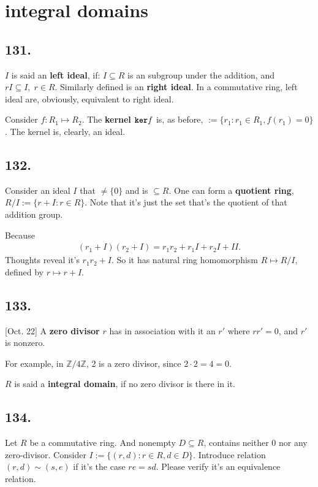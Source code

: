 \documentclass[12pt]{article}
\newcommand\M\cdot%
\newcommand\Mp\mapsto%
\newcommand{\BF}[1]{ \mathbb{#1} }%
\newcommand{\Ss}[1]{\textsf{\bfseries{#1}}}%
\newcommand{\Tw}[1]{\texttt{\bfseries{#1}}}%
\newcommand{\EqGo}[1]{ \begin{gather*}{#1}\end{gather*} } %
\begin{document}
\section{integral domains}
\subsection*{131.} \(I\) is said an \Ss{left ideal}, if: \(I \subseteq R\) is an subgroup under the addition, and \(rI \subseteq I,\; r\in R\). 
Similarly defined is an \Ss{right ideal}. 
In a commutative ring, left ideal are, obviously, equivalent to right ideal. \par
Consider \(f: R_1 \Mp R_2\). 
The \Ss{kernel} \(\Tw{ker} f\) is, as before, \(:= \{r_1: r_1 \in R_1, f(r_1) =0\}\). 
The kernel is, clearly, an ideal.

\subsection*{132.} Consider an ideal \(I\) that \(\neq \{0\}\) and is \(\subseteq R\). 
One can form a \Ss{quotient ring}, \(R/I := \{r+I: r\in R\}\). 
Note that it's just the set that's the quotient of that addition group. \par
Because \EqGo{
 (r_1 + I)(r_2 + I) = r_1 r_2 + r_1 I + r_2 I + II.
} Thoughts reveal it's \(r_1 r_2 +I\). 
So it has natural ring homomorphism \(R \Mp R/I\), defined by \(r \Mp r+I\). 

\subsection*{133.} [Oct. 22] A \Ss{zero divisor} \(r\) has in association with it an \(r'\) where \(rr'=0\), and \(r'\) is nonzero. \par
For example, in \(\BF Z /4 \BF Z\), 2 is a zero divisor, since \(2 \M 2 =4 =0\). \par
\(R\) is said a \Ss{integral domain}, if no zero divisor is there in it. \par

\subsection*{134.} Let \(R\) be a commutative ring. 
And nonempty \(D \subseteq R\), contains neither 0 nor any zero-divisor. 
Consider \(I := \{ (r,d): r \in R, d \in D \}\). 
Introduce relation \((r,d) \sim (s,e)\) if it's the case \(re=sd\). 
Please verify it's an equivalence relation. 
\end{document}
